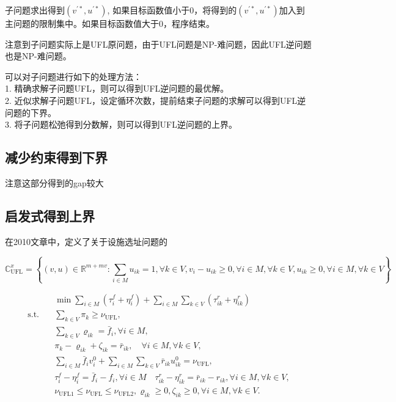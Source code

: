 \documentclass[UTF8]{article}
\begin{document}
子问题求出得到$(v^{'*},u^{'*})$, 如果目标函数值小于0，将得到的$(v^{'*},u^{'*})$加入到主问题的限制集中。如果目标函数值大于0，程序结束。

注意到子问题实际上是UFL原问题，由于UFL问题是NP-难问题，因此UFL逆问题也是NP-难问题。

可以对子问题进行如下的处理方法：\\
1. 精确求解子问题UFL，则可以得到UFL逆问题的最优解。\\
2. 近似求解子问题UFL，设定循环次数，提前结束子问题的求解可以得到UFL逆问题的下界。\\
3. 将子问题松弛得到分数解，则可以得到UFL逆问题的上界。




\subsection{减少约束得到下界}

注意这部分得到的gap较大

\subsection{启发式得到上界}

在2010文章中，定义了关于设施选址问题的

\[
\mathbb{C}_{\mathrm{UFL}}^{x}=\left\{(v, u) \in \mathbb{R}^{m+m v}: \sum_{i \in M} u_{i k}=1, \forall k \in V, v_{i}-u_{i k} \geq 0, \forall i \in M, \forall k \in V, u_{i k} \geq 0, \forall i \in M, \forall k \in V\right\}
\]


\begin{equation}
\begin{aligned}
&\min \sum_{i \in M} \left(\tau_{i}^{f}+\eta_{i}^{f}\right)+\sum_{i \in M} \sum_{k \in V} \left(\tau_{i k}^r+\eta_{i k}^{r}\right) \\
\text{s.t.} \quad &\sum_{k \in V} \pi_{k} \geq \nu_{\mathrm{UFL}}, \\
&\sum_{k \in V} \varrho_{i k}=\bar{f}_{i}, \forall i \in M, \\
&\pi_{k}-\varrho_{i k}+\zeta_{i k}=\bar{r}_{i k}, \quad \forall i \in M, \forall k \in V, \\
&\sum_{i \in M} \bar{f}_{i} v_{i}^{0}+\sum_{i \in M} \sum_{k \in V} \bar{r}_{i k} u_{i k}^{0}=\nu_{\mathrm{UFL}}, \\
& \tau_{i}^{f}-\eta_{i}^{f}=\bar{f}_{i}-f_{i}, \forall i \in M \quad \tau_{i k}^{r}-\eta_{i k}^{r}=\bar{r}_{i k}-r_{i k}, \forall i \in M, \forall k \in V, \\
&\nu_{\mathrm{UFL} 1} \leq \nu_{\mathrm{UFL}} \leq \nu_{\mathrm{UFL} 2}, \varrho_{i k} \geq 0, \zeta_{i k} \geq 0, \forall i \in M, \forall k \in V. \\
\end{aligned}
\end{equation}
\end{document}
